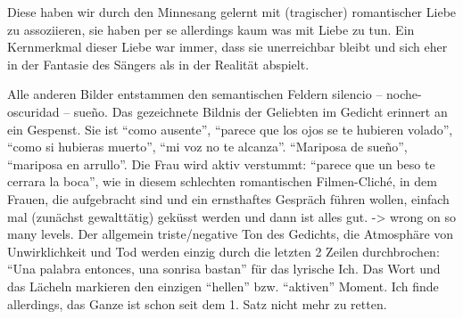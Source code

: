 
Diese haben wir durch den Minnesang gelernt mit (tragischer) romantischer Liebe zu assoziieren, sie haben per se allerdings kaum was mit Liebe zu tun.
Ein Kernmerkmal dieser Liebe war immer, dass sie unerreichbar bleibt und sich eher in der Fantasie des Sängers als in der Realität abspielt. %

Alle anderen Bilder entstammen den semantischen Feldern silencio -- noche-oscuridad -- sueño.
Das gezeichnete Bildnis der Geliebten im Gedicht erinnert an ein Gespenst.
Sie ist ``como ausente'', ``parece que los ojos se te hubieren volado'', ``como si hubieras muerto'', ``mi voz no te alcanza''.
``Mariposa de sueño'', ``mariposa en arrullo''.
Die Frau wird aktiv verstummt: ``parece que un beso te cerrara la boca'', wie in diesem schlechten romantischen Filmen-Cliché, in dem Frauen, die aufgebracht sind und ein ernsthaftes Gespräch führen wollen, einfach mal (zunächst gewalttätig) geküsst werden und dann ist alles gut. -> wrong on so many levels.
Der allgemein triste/negative Ton des Gedichts, die Atmosphäre von Unwirklichkeit und Tod werden einzig durch die letzten 2 Zeilen durchbrochen: ``Una palabra entonces, una sonrisa bastan'' für das lyrische Ich.
Das Wort und das Lächeln markieren den einzigen ``hellen'' bzw. ``aktiven'' Moment.
Ich finde allerdings, das Ganze ist schon seit dem 1. Satz nicht mehr zu retten.

